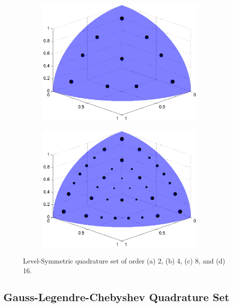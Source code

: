 \begin{figure}
\begin{subfigure}[b]{0.48\textwidth}
		\caption{}
	\end{subfigure}
	\vfill
	\begin{subfigure}[b]{0.48\textwidth}
		\centering
		\includegraphics[width=0.92\textwidth]{figures/sec_Sn/LS8.eps}
		\caption{}
	\end{subfigure}
	\hfill
	\begin{subfigure}[b]{0.48\textwidth}
		\centering
		\includegraphics[width=0.92\textwidth]{figures/sec_Sn/LS16.eps}
		\caption{}
	\end{subfigure}
\caption{Level-Symmetric quadrature set of order (a) 2, (b) 4, (c) 8, and (d) 16.}
\label{fig::Sn_LS_Quad_Sets}
\end{figure}

\subsection{Gauss-Legendre-Chebyshev Quadrature Set}
\label{sec::Sn_Angle_GLC}


